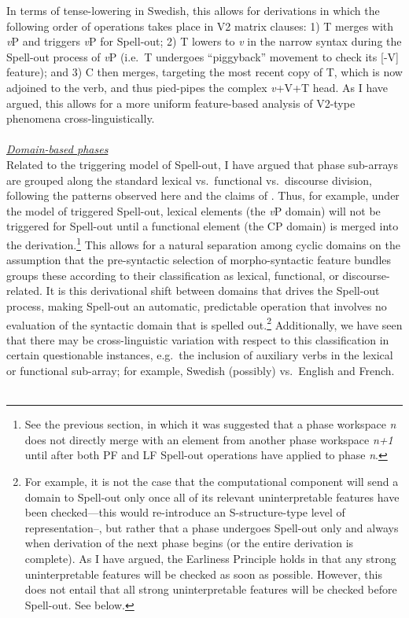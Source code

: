 In terms of tense-lowering in Swedish, this allows for derivations in which the following order of operations takes place in V2 matrix clauses: 1) T merges with {\it v}P and triggers {\it v}P for Spell-out; 2) T lowers to {\it v} in the narrow syntax during the Spell-out process of {\it v}P (i.e.\ T undergoes ``piggyback'' movement to check its [-V] feature); and 3) C\raisebox{-3pt}{\sc{[-t]}} then merges, targeting the most recent copy of T, which is now adjoined to the verb, and thus pied-pipes the complex {\it v}+V+T head. As I have argued, this allows for a more uniform feature-based analysis of V2-type phenomena cross-linguistically.\\\\
\underline{\textit{Domain-based phases}}\\Related to the triggering model of Spell-out, I have argued that phase sub-arrays are grouped along the standard lexical vs.\ functional vs.\ discourse division, following the patterns observed here and the claims of \citet{grohmann2003}. Thus, for example, under the model of triggered Spell-out, lexical elements (the {\it v}P domain) will not be triggered for Spell-out until a functional element (the CP domain) is merged into the derivation.\footnote{See the previous section, in which it was suggested that a phase workspace {\it n} does not directly merge with an element from another phase workspace {\it n+1} until after both PF and LF Spell-out operations have applied to phase {\it n}.} This allows for a natural separation among cyclic domains on the assumption that the pre-syntactic selection of morpho-syntactic feature bundles groups these according to their classification as lexical, functional, or discourse-related. It is this derivational shift between domains that drives the Spell-out process, making Spell-out an automatic, predictable operation that involves no evaluation of the syntactic domain that is spelled out.\footnote{For example, it is not the case that the computational component will send a domain to Spell-out only once all of its relevant uninterpretable features have been checked---this would re-introduce an S-structure-type level of representation--, but rather that a phase undergoes Spell-out only and always when derivation of the next phase begins (or the entire derivation is complete). As I have argued, the Earliness Principle holds in that any strong uninterpretable features will be checked as soon as possible. However, this does not entail that all strong uninterpretable features will be checked before Spell-out. See below.} Additionally, we have seen that there may be cross-linguistic variation with respect to this classification in certain questionable instances, e.g.\ the inclusion of auxiliary verbs in the lexical or functional sub-array; for example, Swedish (possibly) vs.\ English and French.\\\\
